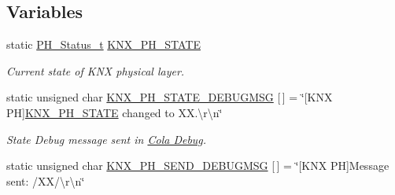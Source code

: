 \subsection*{Variables}
\begin{DoxyCompactItemize}
\item 
static \hyperlink{group___k_n_x___p_h___sup___exported___types_ga5b665a94bef912fbfbea7cc949ed0e49}{P\+H\+\_\+\+Status\+\_\+t} \hyperlink{group___k_n_x___p_h___sup___private___variables_gaed45956ede9586539568adc9994c6dfb}{K\+N\+X\+\_\+\+P\+H\+\_\+\+S\+T\+A\+TE}\hypertarget{group___k_n_x___p_h___sup___private___variables_gaed45956ede9586539568adc9994c6dfb}{}\label{group___k_n_x___p_h___sup___private___variables_gaed45956ede9586539568adc9994c6dfb}

\begin{DoxyCompactList}\small\item\em Current state of K\+NX physical layer. \end{DoxyCompactList}\item 
static unsigned char \hyperlink{group___k_n_x___p_h___sup___private___variables_gaa18f29dc3cf5b41ce81bcf264601d400}{K\+N\+X\+\_\+\+P\+H\+\_\+\+S\+T\+A\+T\+E\+\_\+\+D\+E\+B\+U\+G\+M\+SG} \mbox{[}$\,$\mbox{]} = \char`\"{}\mbox{[}K\+NX PH\mbox{]}\hyperlink{group___k_n_x___p_h___sup___private___variables_gaed45956ede9586539568adc9994c6dfb}{K\+N\+X\+\_\+\+P\+H\+\_\+\+S\+T\+A\+TE} changed to X\+X.\textbackslash{}r\textbackslash{}n\char`\"{}\hypertarget{group___k_n_x___p_h___sup___private___variables_gaa18f29dc3cf5b41ce81bcf264601d400}{}\label{group___k_n_x___p_h___sup___private___variables_gaa18f29dc3cf5b41ce81bcf264601d400}

\begin{DoxyCompactList}\small\item\em State Debug message sent in \hyperlink{group___cola___debug}{Cola Debug}. \end{DoxyCompactList}\item 
static unsigned char \hyperlink{group___k_n_x___p_h___sup___private___variables_ga16f43b8d36bcc39b90564fac102ac721}{K\+N\+X\+\_\+\+P\+H\+\_\+\+S\+E\+N\+D\+\_\+\+D\+E\+B\+U\+G\+M\+SG} \mbox{[}$\,$\mbox{]} = \char`\"{}\mbox{[}K\+NX PH\mbox{]}Message sent\+: /XX/\textbackslash{}r\textbackslash{}n\char`\"{}\hypertarget{group___k_n_x___p_h___sup___private___variables_ga16f43b8d36bcc39b90564fac102ac721}{}\label{group___k_n_x___p_h___sup___private___variables_ga16f43b8d36bcc39b90564fac102ac721}


\end{DoxyCompactItemize}
